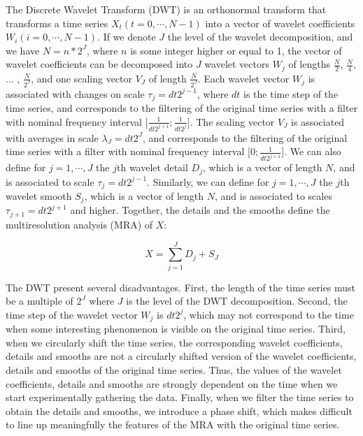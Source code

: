 \documentclass{article}
\begin{document}
The Discrete Wavelet Transform (DWT) is an orthonormal transform that transforms a time series $X_t \left( t = 0, \cdots , N - 1 \right)$ into a vector of wavelet coefficients $W_i \left( i = 0 , \cdots , N - 1 \right)$. If we denote $J$ the level of the wavelet decomposition, and we have $N = n * 2^J$, where $n$ is some integer higher or equal to 1, the vector of wavelet coefficients can be decomposed into $J$ wavelet vectors $W_j$ of lengths $\frac{N}{2}$, $\frac{N}{4}$, ... , $\frac{N}{2^J}$, and one scaling vector $V_J$ of length $\frac{N}{2^J}$. Each wavelet vector $W_j$ is associated with changes on scale $\tau_j = dt 2^{j - 1}$, where $dt$ is the time step of the time series, and corresponds to the filtering of the original time series with a filter with nominal frequency interval $\lbrack \frac{1}{dt 2^{j + 1}} ; \frac{1}{dt 2^j} \rbrack$. The scaling vector $V_J$ is associated with averages in scale $\lambda_J = dt 2^J$, and corresponds to the filtering of the original time series with a filter with nominal frequency interval $\lbrack 0 ; \frac{1}{dt 2^{j + 1}} \rbrack$. We can also define for $j = 1 , \cdots , J$ the $j$th wavelet detail $D_j$, which is a vector of length $N$, and is associated to scale $\tau_j = dt 2^{j - 1}$. Similarly, we can define for $j = 1 , \cdots , J$ the $j$th wavelet smooth $S_j$, which is a vector of length $N$, and is associated to scales $\tau_{j + 1} = dt 2^{j + 1}$ and higher. Together, the details and the smooths define the multiresolution analysis (MRA) of $X$:

\begin{linenomath*}
\begin{equation}
X = \sum_{j = 1}^{J} D_j + S_J
\end{equation}
\end{linenomath*}

The DWT present several disadvantages. First, the length of the time series must be a multiple of $2^J$ where $J$ is the level of the DWT decomposition. Second, the time step of the wavelet vector $W_j$ is $dt 2^j$, which may not correspond to the time when some interesting phenomenon is visible on the original time series. Third, when we circularly shift the time series, the corresponding wavelet coefficients, details and smooths are not a circularly shifted version of the wavelet coefficients, details and smooths of the original time series. Thus, the values of the wavelet coefficients, details and smooths are strongly dependent on the time when we start experimentally gathering the data. Finally, when we filter the time series to obtain the details and smooths, we introduce a phase shift, which makes difficult to line up meaningfully the features of the MRA with the original time series. \\
\end{document}
